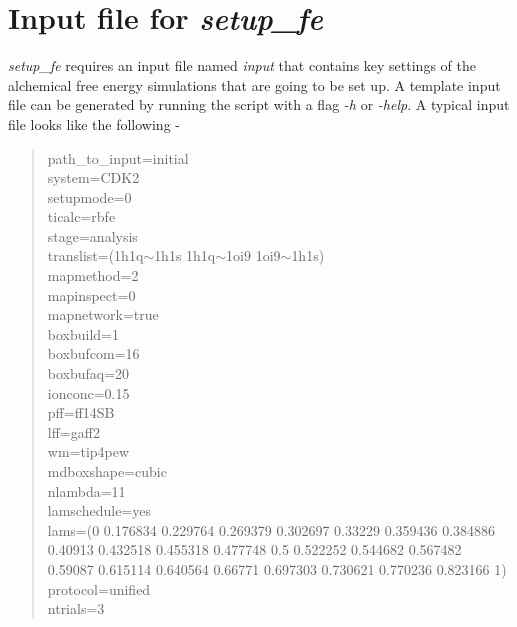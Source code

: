 \documentclass[11pt,letterpaper,titlepage]{article}
\newenvironment{itquote}
  {\begin{quote}\itshape}
  {\end{quote}\ignorespacesafterend}
\begin{document}
\section{Input file for \textit{setup\_fe}}
\vspace{0.1cm}

\textit{setup\_fe} requires an input file named \textit{input} that contains key settings of the
alchemical free energy simulations that are going to be set up. A template input file can be
generated by running the script with a flag \textit{-h} or \textit{-help}. A typical input file looks like the
following -

\vspace{1cm}
\begin{itquote}
	
{\color{blue}
	
path\_to\_input=initial 			\\
system=CDK2 					\\
setupmode=0                      		\\
ticalc=rbfe                      		\\
stage=analysis                   		\\
translist=(1h1q$\sim$1h1s 1h1q$\sim$1oi9 1oi9$\sim$1h1s) 	\\

mapmethod=2 					\\
mapinspect=0 					\\
mapnetwork=true 				\\

boxbuild=1 					\\
boxbufcom=16  		 			\\
boxbufaq=20		 			\\
ionconc=0.15		 			\\
pff=ff14SB					\\
lff=gaff2					\\
wm=tip4pew					\\
mdboxshape=cubic				\\

nlambda=11  					\\
lamschedule=yes					\\
lams=(0 0.176834 0.229764 0.269379 0.302697 0.33229 0.359436 0.384886 0.40913 0.432518 0.455318 0.477748 0.5 0.522252 0.544682 0.567482 0.59087 0.615114 0.640564 0.66771 0.697303 0.730621 0.770236 0.823166 1) \\
protocol=unified 				\\

ntrials=3					\\

}
\end{itquote}
\end{document}
